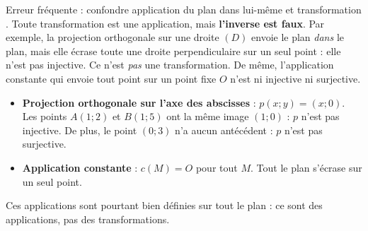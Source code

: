 \documentclass[11pt]{article}
\begin{document}
\begin{attention}
Erreur fréquente : confondre \og application du plan dans lui-même \fg{} et \og transformation \fg{}. Toute transformation est une application, mais \textbf{l'inverse est faux}. Par exemple, la projection orthogonale sur une droite $(D)$ envoie le plan \emph{dans} le plan, mais elle écrase toute une droite perpendiculaire sur un seul point : elle n'est pas injective. Ce n'est \emph{pas} une transformation. De même, l'application constante qui envoie tout point sur un point fixe $O$ n'est ni injective ni surjective.
\end{attention}

\begin{exemplebox}
\begin{itemize}
\item \textbf{Projection orthogonale sur l'axe des abscisses} : $p(x ; y) = (x ; 0)$. Les points $A(1 ; 2)$ et $B(1 ; 5)$ ont la même image $(1 ; 0)$ : $p$ n'est pas injective. De plus, le point $(0 ; 3)$ n'a aucun antécédent : $p$ n'est pas surjective.
\item \textbf{Application constante} : $c(M) = O$ pour tout $M$. Tout le plan s'écrase sur un seul point.
\end{itemize}
Ces applications sont pourtant bien définies sur tout le plan : ce sont des applications, pas des transformations.
\end{exemplebox}
\end{document}
